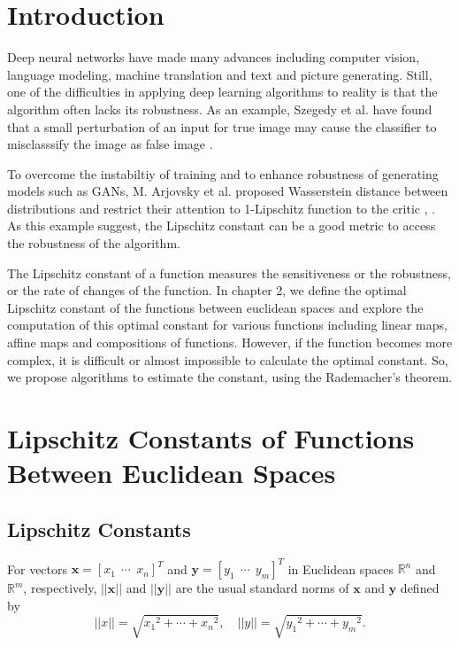 \documentclass[11pt]{report}
\newcommand\bx{\ensuremath{\boldsymbol x}}
\newcommand\by{\ensuremath{\boldsymbol y}}
\begin{document}
\chapter{Introduction}\label{chap:intro}

Deep neural networks have made many advances including computer vision, language modeling, machine translation and text and picture generating.
Still, one of the difficulties in applying deep learning algorithms to reality is that the algorithm often lacks its robustness.
As an example, Szegedy et al. have found that a small perturbation of an input for true image may cause the classifier to misclasssify the image as false image \cite{CS-WZ}.

To overcome the instabiltiy of training and to enhance robustness of generating models such as GANs, M. Arjovsky et al. proposed Wasserstein distance between distributions and restrict their attention to 1-Lipschitz function to the critic \cite{MA-SC}, \cite{GI-AF}.
As this example suggest, the Lipschitz constant can be a good metric to access the robustness of the algorithm.

The Lipschitz constant of a function measures the sensitiveness or the robustness, or the rate of changes of the function.
In chapter 2, we define the optimal Lipschitz constant of the functions between euclidean spaces and explore the computation of this optimal constant for various functions including linear maps, affine maps and compositions of functions.
However, if the function becomes more complex, it is difficult or almost impossible to calculate the optimal constant.
So, we propose algorithms to estimate the constant, using the Rademacher's theorem.

\chapter{Lipschitz Constants of Functions Between Euclidean Spaces}

\section{Lipschitz Constants}
For vectors \(\bx=[x_1\:\:\cdots\:\:x_n]^T\) and \(\by=[y_1\:\:\cdots\:\:y_m]^T\) in Euclidean spaces \(\mathbb R^n\) and \(\mathbb R^m\), respectively, \(||\bx||\) and \(||\by||\) are the usual standard norms of \bx{} and \by{} defined by
\begin{equation}\label{eq:euclidean_norm}
||x||=\sqrt{{x_1}^2+\cdots+{x_n}^2},\quad ||y||=\sqrt{{y_1}^2+\cdots+{y_m}^2}.
\end{equation}
\end{document}

